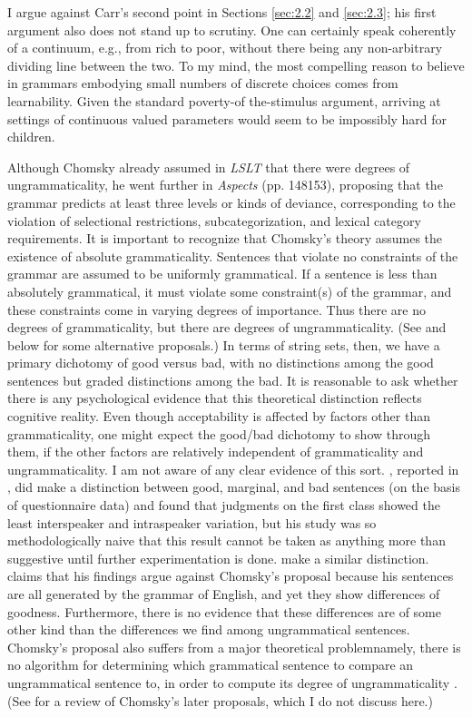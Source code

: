 \indent
I argue against Carr's second point in Sections \ref{sec:2.2} and \ref{sec:2.3};
his first argument also does not stand up to scrutiny. One can certainly speak coherently of a continuum, e.g., from rich to poor, without there being any non-arbitrary dividing line between the two. To my mind, the most compelling reason to believe in grammars embodying small numbers of  discrete  choices  comes  from  learnability.  Given the standard poverty-of the-stimulus argument, arriving at settings of continuous valued parameters would seem to be impossibly hard for children.

Although Chomsky already assumed in \textit{LSLT} that there were degrees of ungrammaticality, he went further in \textit{Aspects} (pp. 148\textendash{}153), proposing that the grammar predicts at least three levels or kinds of deviance, corresponding to the violation of selectional restrictions, subcategorization, and lexical category requirements. It is important to recognize that Chomsky's theory assumes the existence of absolute grammaticality. Sentences that violate no constraints of the grammar are assumed to be uniformly grammatical. If a sentence is less than absolutely grammatical, it must violate some constraint(s)  of  the  grammar,  and these constraints come in varying degrees of importance. Thus there are no degrees of grammaticality, but there are degrees of ungrammaticality. (See \citet[vol. 3]{Levelt1974} and below for some alternative proposals.) In terms of string sets, then, we have a primary dichotomy of good versus bad, with no distinctions among the good sentences but graded distinctions among the bad. It is reasonable to ask whether there is any psychological evidence that this theoretical distinction reflects cognitive reality. Even though acceptability is affected by factors other than grammaticality, one might expect the good/bad dichotomy to show through
them, if the other factors are relatively independent of grammaticality and ungrammaticality. I am not aware of any clear evidence of this sort. \citet{Ross1979}, reported in , 
did make a distinction between good, marginal, and bad sentences (on the basis of questionnaire data) and found that judgments on the first class showed the least interspeaker and intraspeaker variation, but his study was so methodologically naive that this result cannot be taken as anything more than suggestive until further experimentation is done. \citet{QuirkEtAl1966} make a similar distinction. \citet{Watt1975} claims that his findings argue against Chomsky's proposal because his sentences are all generated by the grammar of English, and yet they show differences of goodness. Furthermore, there is no evidence that these differences are of some other kind than the differences we find among ungrammatical sentences. Chomsky's proposal also suffers from a major theoretical problem\schdash{}namely, there is no algorithm for determining which grammatical sentence to compare an ungrammatical sentence to, in order to compute its degree of ungrammaticality \citep{Fillmore1972}. (See \citet{Watt1975} for a review of Chomsky's later proposals, which I do not discuss here.)

